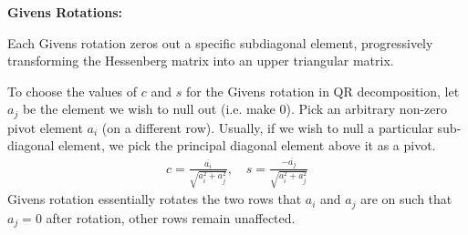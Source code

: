 \documentclass[journal, article]{IEEEtran}
\begin{document}
\newpage
\textbf{Givens Rotations:}

\begin{center}
\end{center}

Each Givens rotation zeros out a specific subdiagonal element, progressively transforming the Hessenberg matrix into an upper triangular matrix.

	To choose the values of $c$ and $s$ for the Givens rotation in QR decomposition, let $a_j$ be the element we wish to null out (i.e. make 0). Pick an arbitrary non-zero pivot element $a_i$ (on a different row). Usually, if we wish to null a particular sub-diagonal element, we pick the principal diagonal element above it as a pivot.
	\begin{align}
		c = \frac{\overline{a_{i}}}{\sqrt{a_{i}^2 + a_{j}^2}}, \quad s = \frac{-\overline{a_{j}}}{\sqrt{a_{i}^2 + a_{j}^2}}
	\end{align}
	Givens rotation essentially rotates the two rows that $a_i$ and $a_j$ are on such that $a_j = 0$ after rotation, other rows remain unaffected.\\ 
\end{document}
